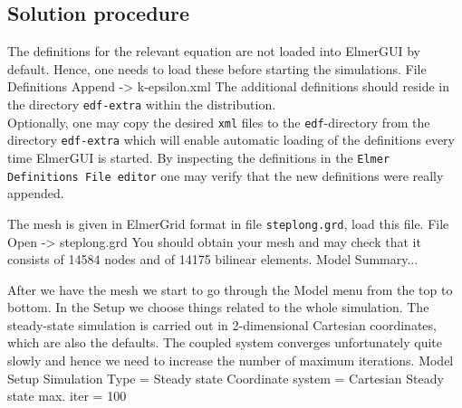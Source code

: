 %


\subsection*{Solution procedure}

The definitions for the relevant equation are not loaded into ElmerGUI by default. Hence, 
one needs to load these before starting the simulations.
\ttbegin
File 
  Definitions
    Append -> k-epsilon.xml
\ttend
The additional definitions should reside in the directory \texttt{edf-extra} within the distribution.\\

Optionally, one may copy the desired \texttt{xml} files to the \texttt{edf}-directory from the 
directory \texttt{edf-extra} which will enable automatic loading of the 
definitions every time ElmerGUI is started. By inspecting the definitions in 
the \texttt{Elmer Definitions File editor} one
may verify that the new definitions were really appended.\newline

The mesh is given in ElmerGrid format in file \texttt{steplong.grd}, load this file.
\ttbegin
File 
  Open -> steplong.grd
\ttend
You should obtain your mesh and may check that it consists of 14584 nodes and of 
14175 bilinear elements.
\ttbegin
Model 
  Summary...
\ttend

After we have the mesh we start to go through the Model menu from the top to bottom. 
In the Setup we choose things related to the whole simulation.
The steady-state simulation is carried out in 2-dimensional Cartesian
coordinates, which are also the defaults.  
The coupled system converges unfortunately quite slowly and hence we need to increase the number of maximum iterations. 
\ttbegin
Model
  Setup 
    Simulation Type = Steady state
    Coordinate system = Cartesian
    Steady state max. iter = 100
\ttend

